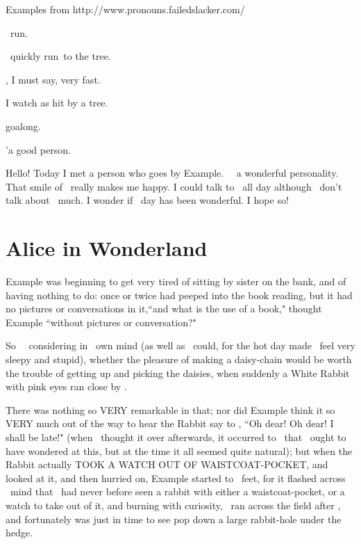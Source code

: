 \documentclass{article}
\begin{document}
Examples from http://www.pronouns.failedslacker.com/

\set

\They\ run\s.

\They\ quickly run\s\ to the tree.

\They[2] \were[2], I must say, very fast.

I watch as \they[2] \are[2] hit by a tree.

\They[3] go\es[3] along.

\They[4]'\re[4] a good person.

Hello! Today I met a person who goes by Example. \They\ \have\ a wonderful personality. That smile of \theirs\ really makes me happy. I could talk to \them\ all day although \they\ do\es n't talk about \themself\ much. I wonder if \their\ day has been wonderful. I hope so!

\section{Alice in Wonderland}

\set
 Example was beginning to get very tired of sitting by \their[1] sister on the bank, and of having nothing to do: once or twice \they[1] had peeped into the book \they[2] \were[2] reading, but it had no pictures or conversations in it,``and what is the use of a book," thought Example ``without pictures or conversation?"

\set
So \they\ \were\ considering in \their\ own mind (as well as \they\ could, for the hot day made \them\ feel very sleepy and stupid), whether the pleasure of making a daisy-chain would be worth the trouble of getting up and picking the daisies, when suddenly a White Rabbit with pink eyes ran close by \them.

\set
There was nothing so VERY remarkable in that; nor did Example think it so VERY much out of the way to hear the Rabbit say to \themself[2], ``Oh dear! Oh dear! I shall be late!" (when \they\ thought it over afterwards, it occurred to \them\ that \they\ ought to have wondered at this, but at the time it all seemed quite natural); but when the Rabbit actually TOOK A WATCH OUT OF \their[2] WAISTCOAT-POCKET, and looked at it, and then hurried on, Example started to \their\ feet, for it flashed across \their\ mind that \they\ had never before seen a rabbit with either a waistcoat-pocket, or a watch to take out of it, and burning with curiosity, \they\ ran across the field after \them[2], and fortunately was just in time to see \them[2] pop down a large rabbit-hole under the hedge.
\end{document}
